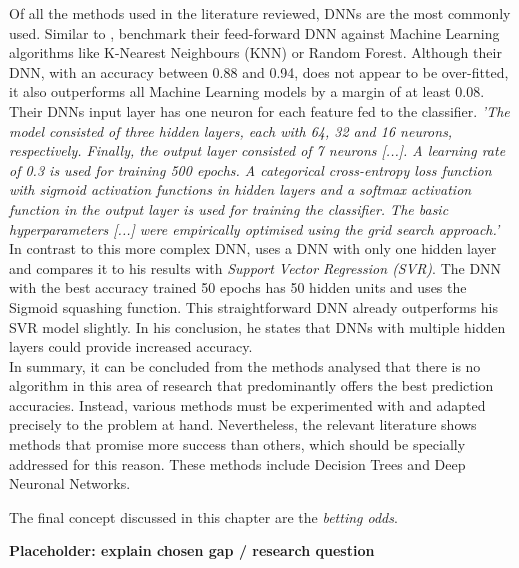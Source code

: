 Of all the methods used in the literature reviewed, DNNs are the most commonly used. Similar to \citet{deng_analysis_2020}, \citet{bhateja_analysis_2021} benchmark their feed-forward DNN against Machine Learning algorithms like K-Nearest Neighbours (KNN) or Random Forest. Although their DNN, with an accuracy between 0.88 and 0.94, does not appear to be over-fitted, it also outperforms all Machine Learning models by a margin of at least 0.08. Their DNNs input layer has one neuron for each feature fed to the classifier. \emph{'The model consisted of three hidden layers, each with 64, 32 and 16 neurons, respectively. Finally, the output layer consisted of 7 neurons [...]. A learning rate of 0.3 is used for training 500 epochs. A categorical cross-entropy loss function with sigmoid activation functions in hidden layers and a softmax activation function in the output layer is used for training the classifier. The basic hyperparameters [...] were empirically optimised using the grid search approach.'} \parencite[, p. 7]{bhateja_analysis_2021} In contrast to this more complex DNN, \citet{lutz_fantasy_2015} uses a DNN with only one hidden layer and compares it to his results with \emph{Support Vector Regression (SVR)}. The DNN with the best accuracy trained 50 epochs has 50 hidden units and uses the Sigmoid squashing function. This straightforward DNN already outperforms his SVR model slightly. In his conclusion, he states that DNNs with multiple hidden layers could provide increased accuracy. \parencite[cf.][, p. 5]{lutz_fantasy_2015} \\
\indent In summary, it can be concluded from the methods analysed that there is no algorithm in this area of research that predominantly offers the best prediction accuracies. Instead, various methods must be experimented with and adapted precisely to the problem at hand. Nevertheless, the relevant literature shows methods that promise more success than others, which should be specially addressed for this reason. These methods include Decision Trees and Deep Neuronal Networks.

The final concept discussed in this chapter are the \emph{betting odds}. 

\textbf{Placeholder: explain chosen gap / research question }


